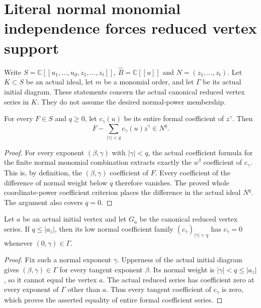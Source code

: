 \section{Literal normal monomial independence forces reduced vertex support}

Write $S=\mathbb C[[u_1,\ldots,u_d,z_1,\ldots,z_t]]$,
$\widehat B=\mathbb C[[u]]$ and $N=(z_1,\ldots,z_t)$.
Let $K\subset S$ be an actual ideal, let $m$ be a monomial order,
and let $\Gamma$ be its actual initial diagram. These statements concern
the actual canonical reduced vertex series in $K$. They do not assume
the desired normal-power membership.

\begin{lemma}
\label{hir:actual-reduced-normal-support-reconstruction}
\leanok
{}
For every $F\in S$ and $q\geq0$, let $c_\gamma(u)$ be its entire formal
coefficient of $z^\gamma$. Then
\[
 F-\sum_{|\gamma|<q}c_\gamma(u)z^\gamma\in N^q.
\]
\end{lemma}
\begin{proof}
For every exponent $(\beta,\gamma)$ with $|\gamma|<q$, the actual
coefficient formula for the finite normal monomial combination extracts
exactly the $u^\beta$ coefficient of $c_\gamma$. This is, by definition,
the $(\beta,\gamma)$ coefficient of $F$. Every coefficient of the
difference of normal weight below $q$ therefore vanishes. The proved
whole coordinate-power coefficient criterion places the difference in
the actual ideal $N^q$. The argument also covers $q=0$.
\end{proof}

\begin{lemma}
\label{hir:actual-reduced-normal-support-standard-coefficients}
\leanok
{}
Let $a$ be an actual initial vertex and let $G_a$ be the canonical
reduced vertex series. If $q\leq |a_z|$, then its low normal coefficient
family $(c_\gamma)_{|\gamma|<q}$ has $c_\gamma=0$ whenever
$(0,\gamma)\in\Gamma$.
\end{lemma}
\begin{proof}
Fix such a normal exponent $\gamma$. Upperness of the actual initial
diagram gives $(\beta,\gamma)\in\Gamma$ for every tangent exponent
$\beta$. Its normal weight is $|\gamma|<q\leq|a_z|$, so it cannot
equal the vertex $a$. The actual reduced series has coefficient zero
at every exponent of $\Gamma$ other than $a$. Thus every tangent
coefficient of $c_\gamma$ is zero, which proves the asserted equality
of entire formal coefficient series.
\end{proof}

